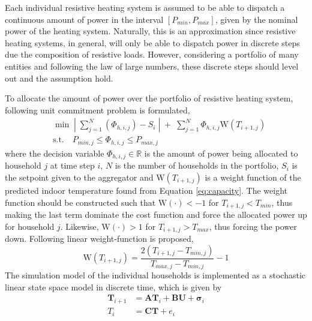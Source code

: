 Each individual resistive heating system is assumed to be able to dispatch a continuous amount of power in the interval $\left[P_{min}, P_{max}\right]$, given by the nominal power of the heating system. Naturally, this is an approximation since resistive heating systems, in general, will only be able to dispatch power in discrete steps due the composition of resistive loads. However, considering a portfolio of many entities and following the law of large numbers, these discrete steps should level out and the assumption hold. 

To allocate the amount of power over the portfolio of resistive heating system, following unit commitment problem is formulated,
\begin{align}\label{eq:agg_dispatch}
  & \min\;\left|\; \sum_{j=1}^N \left(\Phi_{h,i,j}\right) - S_i \;\right|\; + \; \sum^{N}_{j=1}\Phi_{h,i,j}\mbox{W}\left(T_{i+1,j}\right)	\\[5mm]\nonumber
  & \mbox{s.t.} \quad P_{min,j} \leq \Phi_{h,i,j} \leq P_{max,j}  
\end{align}
where the decision variable  $\Phi_{h,i,j}\in\mathbb{R}$ is the amount of power being allocated to household $j$ at time step $i$, $N$ is the number of households in the portfolio, $S_i$ is the setpoint given to the aggregator and $\mbox{W}\left(T_{i+1,j}\right)$ is a weight function of the predicted indoor temperature found from Equation \eqref{eq:capacity}. The weight function should be constructed such that $\mbox{W}\left(\cdot\right)<-1$ for $T_{i+1,j} < T_{min}$, thus making the last term dominate the cost function and force the allocated power up for household $j$. Likewise, $\mbox{W}\left(\cdot\right)>1$ for $T_{i+1,j} > T_{max}$, thus forcing the power down. Following linear weight-function is proposed,
\begin{equation}\label{eq:weight_fct}
  \mbox{W}\left(T_{i+1,j}\right) = \frac{2\left(T_{i+1,j}-T_{min,j} \right)}{T_{max,j} - T_{min,j}}-1 
\end{equation}
The simulation model of the individual households is implemented as a stochastic linear state space model in discrete time, which is     given by
\begin{align}\label{eq:simulation_model}
  \boldsymbol{T}_{i+1} &= \boldsymbol{A}\boldsymbol{T}_i + \boldsymbol{B}\boldsymbol{U} + \boldsymbol{\sigma}_i \\\nonumber
  T_i &= \boldsymbol{C}\boldsymbol{T} + e_i
\end{align}
